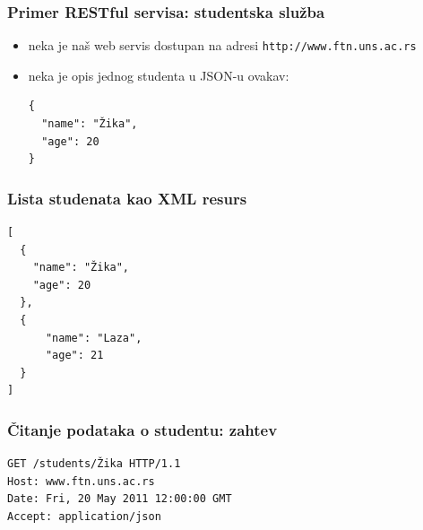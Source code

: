 \documentclass[compress]{beamer}
\begin{document}

\begin{frame}[fragile]
  \frametitle{Primer RESTful servisa: studentska služba}

  \begin{itemize}
  \item neka je naš web servis dostupan na adresi \texttt{http://www.ftn.uns.ac.rs}
  \item neka je opis jednog studenta u JSON-u ovakav:\\
\begin{verbatim}
{
  "name": "Žika",
  "age": 20
}
\end{verbatim}
  \end{itemize}
\end{frame}

\begin{frame}[fragile]
  \frametitle{Lista studenata kao XML resurs}

\begin{verbatim}
[
  {
    "name": "Žika",
    "age": 20
  },
  {
      "name": "Laza",
      "age": 21
  }
]
\end{verbatim}
\end{frame}


\begin{frame}[fragile]
  \frametitle{Čitanje podataka o studentu: zahtev}

\begin{verbatim}
GET /students/Žika HTTP/1.1
Host: www.ftn.uns.ac.rs
Date: Fri, 20 May 2011 12:00:00 GMT
Accept: application/json
\end{verbatim}
\end{frame}
\end{document}
